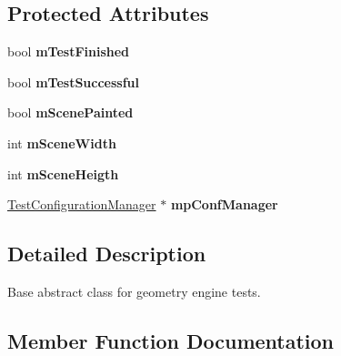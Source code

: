 \subsection*{Protected Attributes}
\begin{DoxyCompactItemize}
\item 
\mbox{\label{class_unit_test_1_1_c_base_geometry_test_a4c58e0bd06c8f9d6b0241de65185fc47}} 
bool {\bfseries m\+Test\+Finished}
\item 
\mbox{\label{class_unit_test_1_1_c_base_geometry_test_a7732a8d8ca5751fe3fe8236ba4434e89}} 
bool {\bfseries m\+Test\+Successful}
\item 
\mbox{\label{class_unit_test_1_1_c_base_geometry_test_ad8b568275b947b3674198220ee8399e2}} 
bool {\bfseries m\+Scene\+Painted}
\item 
\mbox{\label{class_unit_test_1_1_c_base_geometry_test_a8766907f2f7aeeced4164749ad92b1f2}} 
int {\bfseries m\+Scene\+Width}
\item 
\mbox{\label{class_unit_test_1_1_c_base_geometry_test_a2ca0cc2fb2786ebd3c4038719429d849}} 
int {\bfseries m\+Scene\+Heigth}
\item 
\mbox{\label{class_unit_test_1_1_c_base_geometry_test_a29e8c91b47e5251ee0086cd545d20469}} 
\mbox{\hyperlink{class_unit_test_1_1_test_configuration_manager}{Test\+Configuration\+Manager}} $\ast$ {\bfseries mp\+Conf\+Manager}
\end{DoxyCompactItemize}


\subsection{Detailed Description}
Base abstract class for geometry engine tests. 

\subsection{Member Function Documentation}
\mbox{\label{class_unit_test_1_1_c_base_geometry_test_a16e5804e7f134ae519722c47e756e3b0}} 
